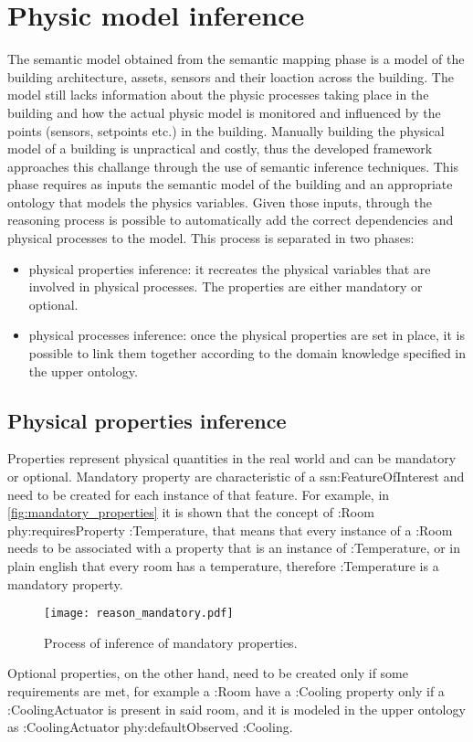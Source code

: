 \section{Physic model inference}
The semantic model obtained from the semantic mapping phase is a model of the building architecture, assets, sensors and their loaction across the building. The model still lacks information about the physic processes taking place in the building and how the actual physic model is monitored and influenced by the points (sensors, setpoints etc.) in the building. Manually building the physical model of a building is unpractical and costly, thus the developed framework approaches this challange through the use of semantic inference techniques. This phase requires as inputs the semantic model of the building and an appropriate ontology that models the physics variables. %
Given those inputs, through the reasoning process is possible to automatically add the correct dependencies and physical processes to the model. This process is separated in two phases:
\begin{itemize}
  \item physical properties inference: it recreates the physical variables that are involved in physical processes. The properties are either mandatory or optional.
  \item physical processes inference: once the physical properties are set in place, it is possible to link them together according to the domain knowledge specified in the upper ontology.
\end{itemize}

\subsection{Physical properties inference}
Properties represent physical quantities in the real world and can be mandatory or optional. Mandatory property are characteristic of a ssn:FeatureOfInterest and need to be created for each instance of that feature. For example, in \autoref{fig:mandatory_properties} it is shown that the concept of :Room phy:requiresProperty :Temperature, that means that every instance of a :Room needs to be associated with a property that is an instance of :Temperature, or in plain english that every room has a temperature, therefore :Temperature is a mandatory property.
\begin{figure}
  \centering
  \texttt{[image: reason\_mandatory.pdf]}
  \caption{Process of inference of mandatory properties.}
  \label{fig:mandatory_properties}
\end{figure}
Optional properties, on the other hand, need to be created only if some requirements are met, for example a :Room have a :Cooling property only if a :CoolingActuator is present in said room, and it is modeled in the upper ontology as :CoolingActuator phy:defaultObserved :Cooling.

